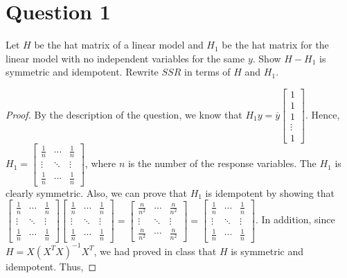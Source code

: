 \section{Question 1}

\begin{question}
    Let $H$ be the hat matrix of a linear model and $H_1$ be the hat matrix for the linear model with no independent variables for the same $y$. Show $H −H_1$ is symmetric and idempotent. Rewrite $SSR$ in terms of $H$ and $H_1$.
\end{question}

\begin{answer}
\begin{proof}
    By the description of the question, we know that $H_1y = \overline{y}\left[\begin{smallmatrix}1\\1\\1\\ \vdots \\1 \end{smallmatrix}\right]$. Hence, $H_1 = \left[\begin{smallmatrix}\tfrac{1}{n}&\cdots&\tfrac{1}{n}\\ \vdots & \ddots & \vdots\\ \tfrac{1}{n} & \cdots & \tfrac{1}{n}\end{smallmatrix}\right]$, where $n$ is the number of the response variables. The $H_1$ is clearly symmetric. Also, we can prove that $H_1$ is idempotent by showing that $\left[\begin{smallmatrix}\tfrac{1}{n}&\cdots&\tfrac{1}{n}\\ \vdots & \ddots & \vdots\\ \tfrac{1}{n} & \cdots & \tfrac{1}{n}\end{smallmatrix}\right] \left[\begin{smallmatrix}\tfrac{1}{n}&\cdots&\tfrac{1}{n}\\ \vdots & \ddots & \vdots\\ \tfrac{1}{n} & \cdots & \tfrac{1}{n}\end{smallmatrix}\right] = \left[\begin{smallmatrix}\tfrac{n}{n^2}&\cdots&\tfrac{n}{n^2}\\ \vdots & \ddots & \vdots\\ \tfrac{n}{n^2} & \cdots & \tfrac{n}{n^2}\end{smallmatrix}\right] = \left[\begin{smallmatrix}\tfrac{1}{n}&\cdots&\tfrac{1}{n}\\ \vdots & \ddots & \vdots\\ \tfrac{1}{n} & \cdots & \tfrac{1}{n}\end{smallmatrix}\right]$. In addition, since $H = X(X^TX)^{-1}X^T$, we had proved in class that $H$ is symmetric and idempotent. Thus, 

\end{proof}
\end{answer}
